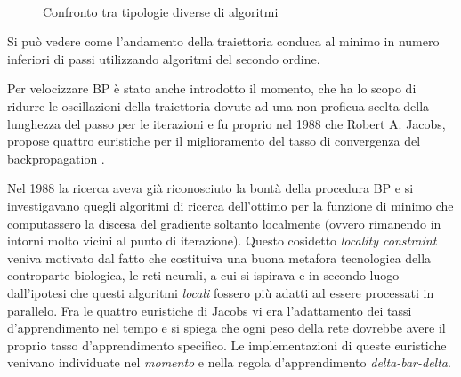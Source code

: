 \begin{figure}[hbtb]
\centering
{} \quad
{} \\
\caption{Confronto tra tipologie diverse di algoritmi}
\label{discese}
\end{figure}


Si può vedere come l'andamento della traiettoria conduca al minimo in numero inferiori di passi utilizzando algoritmi del secondo ordine.

Per velocizzare BP è stato anche introdotto il momento, che ha lo scopo di ridurre le oscillazioni della traiettoria dovute ad una non proficua scelta della lunghezza del passo per le iterazioni e fu proprio nel 1988 che Robert A. Jacobs, propose quattro euristiche per il miglioramento del tasso di convergenza del backpropagation \cite{nielsen_book}.

Nel 1988 la ricerca aveva già riconosciuto la bontà della procedura BP e si investigavano quegli algoritmi di ricerca dell'ottimo per la funzione di minimo che computassero la discesa del gradiente soltanto localmente (ovvero rimanendo in intorni molto vicini al punto di iterazione). Questo cosidetto \textit{locality constraint} veniva motivato dal fatto che costituiva una buona metafora tecnologica della controparte biologica, le reti neurali, a cui si ispirava e in secondo luogo dall'ipotesi che questi algoritmi \textit{locali} fossero più adatti ad essere processati in parallelo.
Fra le quattro euristiche di Jacobs vi era l'adattamento dei tassi d'apprendimento nel tempo e si spiega che ogni peso della rete dovrebbe avere il proprio tasso d'apprendimento specifico. Le implementazioni di queste euristiche venivano individuate nel \textit{momento} e nella regola d'apprendimento \textit{delta-bar-delta}.
